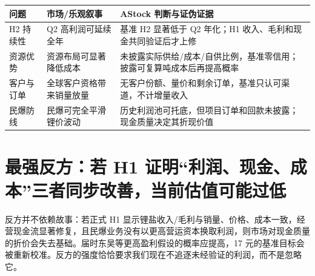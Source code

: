 \begin{exhibitbox}[表 2-2：预期差与可证伪条件]
\begin{tabularx}{\exhibitboxwidth}{L{2.8cm}X X}
\toprule
问题 & 市场/乐观叙事 & AStock 判断与证伪证据 \\
\midrule
H2 持续性 & Q2 高利润可延续全年 & 基准 H2 显著低于 Q2 年化；H1 收入、毛利和现金共同验证后才上修 \\
资源优势 & 资源布局可显著降低成本 & 未披露实际供给/成本/自供比例，基准零信用；披露可复算吨成本后再提高概率 \\
客户与订单 & 全球客户资格带来销量放量 & 无客户份额、量价和剩余订单，基准只认可渠道，不计增量收入 \\
民爆防线 & 民爆可完全平滑锂价波动 & 历史利润池可托底，但项目订单和回款未披露；现金质量决定其折现价值 \\
\bottomrule
\end{tabularx}
\end{exhibitbox}

\section{最强反方：若 H1 证明“利润、现金、成本”三者同步改善，当前估值可能过低}

反方并不依赖故事：若正式 H1 显示锂盐收入/毛利与销量、价格、成本一致，经营现金流显著修复，且民爆业务没有以更高营运资本换取利润，则市场对现金质量的折价会失去基础。届时东吴等更高盈利假设的概率应提高，17 元的基准目标会被重新校准。反方的强度恰恰要求我们现在不追逐未经验证的利润，而不是忽略它。
